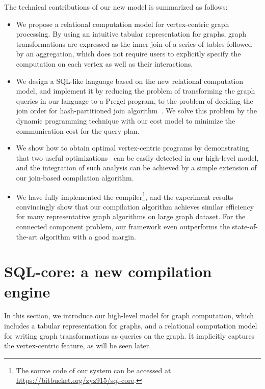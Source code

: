 \documentclass{sokendai_thesis} %
\begin{document}
The technical contributions of our new model is summarized as follows:
\begin{itemize}
  \item
    We propose a relational computation model for vertex-centric graph processing.
    By using an intuitive tabular representation for graphs, graph transformations are expressed as the inner join of a series of tables followed by an aggregation, which does not require users to explicitly specify the computation on each vertex as well as their interactions.
  \item
    We design a SQL-like language based on the new relational computation model, and implement it by reducing the problem of transforming the graph queries in our language to a Pregel program, to the problem of deciding the join order for hash-partitioned join algorithm~\cite{hashjoin-mp}.
    We solve this problem by the dynamic programming technique with our cost model to minimize the communication cost for the query plan.
  \item
    We show how to obtain optimal vertex-centric programs by demonstrating that two useful optimizations~\cite{yan2015effective,zhang2019composing} can be easily detected in our high-level model, and the integration of such analysis can be achieved by a simple extension of our join-based compilation algorithm.
  \item
    We have fully implemented the compiler\footnote{The source code of our system can be accessed at \url{https://bitbucket.org/zyz915/sql-core}.}, and the experiment results convincingly show that our compilation algorithm achieves similar efficiency for many representative graph algorithms on large graph dataset.
    For the connected component problem, our framework even outperforms the state-of-the-art algorithm with a good margin.
\end{itemize}

\section{SQL-core: a new compilation engine}

In this section, we introduce our high-level model for graph computation, which includes a tabular representation for graphs, and a relational computation model for writing graph transformations as queries on the graph.
It implicitly captures the vertex-centric feature, as will be seen later.
\end{document}
